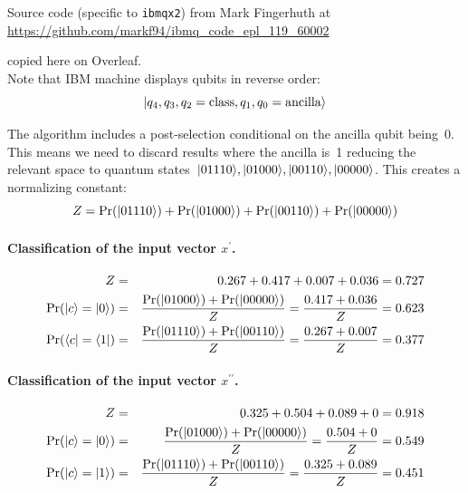 \documentclass{article}
\DeclarePairedDelimiter\bra{\langle}{\rvert}
\DeclarePairedDelimiter\ket{\lvert}{\rangle}
\begin{document}
\noindent Source code (specific to \texttt{ibmqx2}) from Mark Fingerhuth at \\ \url{https://github.com/markf94/ibmq_code_epl_119_60002}

\noindent copied here on Overleaf. \\

\noindent Note that IBM machine displays qubits in reverse order:
\begin{equation*}
\ket{q_4, q_3, q_2 = \mbox{class}, q_1, q_0 = \mbox{ancilla}}
\end{equation*}

\noindent The algorithm includes a post-selection conditional on the ancilla qubit being~0.  This means we need to discard results where the ancilla is~1 reducing the relevant space to quantum states~$\ket{01110}, \ket{01000}, \ket{00110}, \ket{00000}$.  This creates a normalizing constant:
\begin{equation*}
Z = \mbox{Pr}(\ket{01110}) + \mbox{Pr}(\ket{01000}) + \mbox{Pr}( \ket{00110}) + \mbox{Pr}(\ket{00000})
\end{equation*}

\paragraph{Classification of the input vector $x^\prime$.}

\begin{eqnarray*}
Z &=& 0.267 + 0.417 + 0.007 + 0.036 = 0.727 \\
\mbox{Pr}(\ket{c}=\ket{0}) &=& \frac{\mbox{Pr}(\ket{01000}) + \mbox{Pr}(\ket{00000})}{Z} = \frac{0.417 + 0.036}{Z} = 0.623 \\
\mbox{Pr}(\bra{c}=\bra{1}) &=& \frac{\mbox{Pr}(\ket{01110}) + \mbox{Pr}( \ket{00110})}{Z} = \frac{0.267 + 0.007}{Z} = 0.377
\end{eqnarray*}

\paragraph{Classification of the input vector $x^{\prime \prime} $.}

\begin{eqnarray*}
Z &=& 0.325 + 0.504 + 0.089 + 0 = 0.918 \\
\mbox{Pr}(\ket{c}=\ket{0}) &=& \frac{\mbox{Pr}(\ket{01000}) + \mbox{Pr}(\ket{00000})}{Z} = \frac{0.504 + 0}{Z} = 0.549 \\
\mbox{Pr}(\ket{c}=\ket{1}) &=& \frac{\mbox{Pr}(\ket{01110}) + \mbox{Pr}( \ket{00110})}{Z} = \frac{0.325 + 0.089}{Z} = 0.451
\end{eqnarray*}
\end{document}
